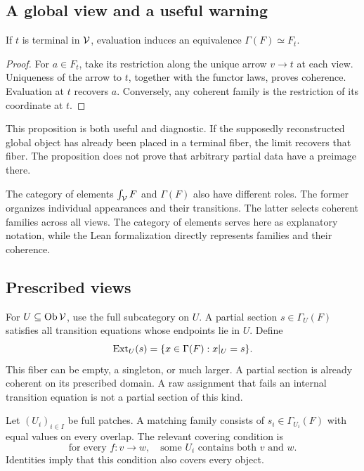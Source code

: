 \subsection{A global view and a useful warning}
\begin{KSproposition}\label{KS:KS03}
If \(t\) is terminal in \(\mathcal V\), evaluation induces an equivalence \(\Gamma(F)\simeq F_t\).
\end{KSproposition}
\begin{proof}
For \(a\in F_t\), take its restriction along the unique arrow \(v\to t\) at each view. Uniqueness of the arrow to \(t\), together with the functor laws, proves coherence. Evaluation at \(t\) recovers \(a\). Conversely, any coherent family is the restriction of its coordinate at \(t\).
\end{proof}
This proposition is both useful and diagnostic. If the supposedly reconstructed global object has already been placed in a terminal fiber, the limit recovers that fiber. The proposition does not prove that arbitrary partial data have a preimage there.

The category of elements \(\int_\mathcal V F\) and \(\Gamma(F)\) also have different roles. The former organizes individual appearances and their transitions. The latter selects coherent families across all views. The category of elements serves here as explanatory notation, while the Lean formalization directly represents families and their coherence.

\label{KS:sec:glue}
\subsection{Prescribed views}
For \(U\subseteq\operatorname{Ob}\mathcal V\), use the full subcategory on \(U\). A partial section \(s\in\Gamma_U(F)\) satisfies all transition equations whose endpoints lie in \(U\). Define
\begin{equation}\label{KS:eq:extension}
 \operatorname{Ext}_U(s)=\{x\in\Gamma(F):x|_U=s\}.
\end{equation}
This fiber can be empty, a singleton, or much larger. A partial section is already coherent on its prescribed domain. A raw assignment that fails an internal transition equation is not a partial section of this kind.

Let \((U_i)_{i\in I}\) be full patches. A matching family consists of \(s_i\in\Gamma_{U_i}(F)\) with equal values on every overlap. The relevant covering condition is
\begin{equation}\label{KS:eq:transitioncover}
 \text{for every }f:v\to w,\quad
 \text{some }U_i\text{ contains both }v\text{ and }w.
\end{equation}
Identities imply that this condition also covers every object.

